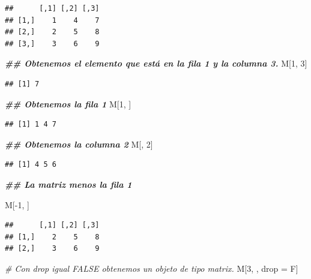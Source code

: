 \documentclass[
  12pt,
]{book}
\newenvironment{Shaded}{\begin{snugshade}}{\end{snugshade}}
\newcommand{\CommentTok}[1]{\textcolor[rgb]{0.56,0.35,0.01}{\textit{#1}}}
\newcommand{\DecValTok}[1]{\textcolor[rgb]{0.00,0.00,0.81}{#1}}
\newcommand{\DocumentationTok}[1]{\textcolor[rgb]{0.56,0.35,0.01}{\textbf{\textit{#1}}}}
\newcommand{\NormalTok}[1]{#1}
\newcommand{\OtherTok}[1]{\textcolor[rgb]{0.56,0.35,0.01}{#1}}
\newcommand{\SpecialCharTok}[1]{\textcolor[rgb]{0.00,0.00,0.00}{#1}}
\begin{document}
\begin{verbatim}
##      [,1] [,2] [,3]
## [1,]    1    4    7
## [2,]    2    5    8
## [3,]    3    6    9
\end{verbatim}

\begin{Shaded}
\begin{Highlighting}[]
\DocumentationTok{\#\# Obtenemos el elemento que está en la fila 1 y la columna 3.}
\NormalTok{M[}\DecValTok{1}\NormalTok{, }\DecValTok{3}\NormalTok{]}
\end{Highlighting}
\end{Shaded}

\begin{verbatim}
## [1] 7
\end{verbatim}

\begin{Shaded}
\begin{Highlighting}[]
\DocumentationTok{\#\# Obtenemos la fila 1}
\NormalTok{M[}\DecValTok{1}\NormalTok{, ]}
\end{Highlighting}
\end{Shaded}

\begin{verbatim}
## [1] 1 4 7
\end{verbatim}

\begin{Shaded}
\begin{Highlighting}[]
\DocumentationTok{\#\# Obtenemos la columna 2}
\NormalTok{M[, }\DecValTok{2}\NormalTok{]}
\end{Highlighting}
\end{Shaded}

\begin{verbatim}
## [1] 4 5 6
\end{verbatim}

\begin{Shaded}
\begin{Highlighting}[]
\DocumentationTok{\#\# La matriz menos la fila 1}

\NormalTok{M[}\SpecialCharTok{{-}}\DecValTok{1}\NormalTok{, ]}
\end{Highlighting}
\end{Shaded}

\begin{verbatim}
##      [,1] [,2] [,3]
## [1,]    2    5    8
## [2,]    3    6    9
\end{verbatim}

\begin{Shaded}
\begin{Highlighting}[]
\CommentTok{\# Con drop igual FALSE obtenemos un objeto de tipo matrix.}
\NormalTok{M[}\DecValTok{3}\NormalTok{, , drop }\OtherTok{=}\NormalTok{ F]}
\end{Highlighting}
\end{Shaded}
\end{document}
